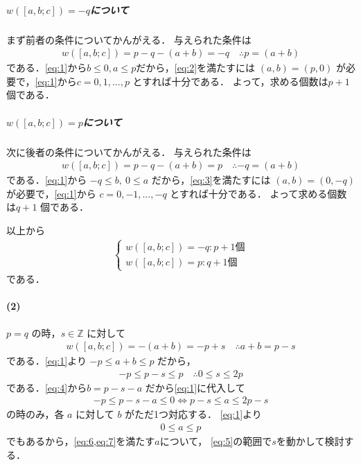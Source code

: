 \documentclass[../../main.tex]{subfiles}
\begin{document}
\subparagraph{$w([a, b; c])=-q$について}

まず前者の条件についてかんがえる．
与えられた条件は
\begin{align}
  w([a, b; c]) = p - q - (a+b) = -q \quad \therefore p = (a+b) \label{eq:2}
\end{align}
である．\cref{eq:1}から$b \le 0, a \le p$だから，\cref{eq:2}を満たすには
$(a, b) = (p, 0)$ が必要で，\cref{eq:1}から$c = 0, 1, \dots, p$ とすれば十分である．
よって，求める個数は$p+1$ 個である．

\subparagraph{$w([a, b; c])=p$について}

次に後者の条件についてかんがえる．
与えられた条件は
\begin{align}
  w([a, b; c]) = p - q - (a+b) = p \quad \therefore -q = (a+b) \label{eq:3}
\end{align}
である．\cref{eq:1}から $-q \le b, \ 0 \le a$ だから，\cref{eq:3}を満たすには
$(a, b) = (0, -q)$ が必要で，\cref{eq:1}から $c = 0, -1, \dots, -q$ とすれば十分である．
よって求める個数は$q+1$ 個である．
\casesend

以上から
\begin{align}
  \begin{cases}
    w([a, b; c])=-q: p+1\text{個} \\
    w([a, b; c])=p: q+1\text{個}
  \end{cases}
\end{align}
である．

\paragraph{(2)}

$p = q$ の時，$s \in \mathbb{Z}$ に対して
\begin{align}
  w([a, b; c]) = -(a+b) = -p + s \quad \therefore a+b = p-s \label{eq:4}
\end{align}
である．\cref{eq:1}より $-p \le a+b \le p$ だから，
\begin{align}
  -p \le p-s \le p \quad \therefore 0 \le s \le 2p \label{eq:5}
\end{align}
である．\cref{eq:4}から$b = p-s-a$ だから\cref{eq:1}に代入して
\begin{align}
  -p \le p-s-a \le 0 \iff p-s \le a \le 2p-s \label{eq:6}
\end{align}
の時のみ，各 $a$ に対して $b$ がただ1つ対応する．
\cref{eq:1}より
\begin{align}
  0 \le a \le p \label{eq:7}
\end{align}
でもあるから，\cref{eq:6,eq:7}を満たす$a$について，
\cref{eq:5}の範囲で$s$を動かして検討する．
\end{document}
